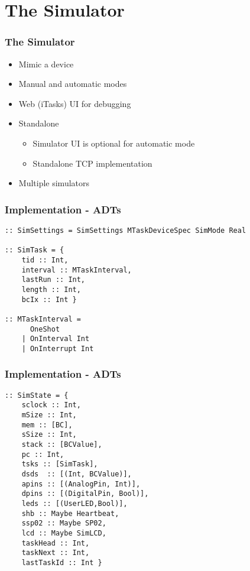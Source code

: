 \documentclass[department=icis, notes={show notes}, slidesperpage=1, official=true,showdate=true,slidenumbers=relative]{beamerruhuisstijl}
\begin{document}
\section{The Simulator}
\begin{frame}[fragile]
  \frametitle{The Simulator}
  \begin{itemize}
      \setlength\itemsep{1em}
      \item Mimic a device
      \item Manual and automatic modes
      \item Web (iTasks) UI for debugging
      \item Standalone
      \begin{itemize}[label=$\diamond$]
          \item Simulator UI is optional for automatic mode
          \item Standalone TCP implementation
      \end{itemize}
      \item Multiple simulators
  \end{itemize}
\end{frame}

\begin{frame}[fragile]
  \frametitle{Implementation - ADTs}
  \begin{lstlisting}
:: SimSettings = SimSettings MTaskDeviceSpec SimMode Real

:: SimTask = {
	tid :: Int,
	interval :: MTaskInterval,
	lastRun :: Int,
	length :: Int,
	bcIx :: Int }
	
:: MTaskInterval = 
      OneShot
    | OnInterval Int
    | OnInterrupt Int 
  \end{lstlisting}
\end{frame}

\begin{frame}[fragile]
  \frametitle{Implementation - ADTs}
  \begin{lstlisting}
:: SimState = { 
	sclock :: Int,
	mSize :: Int, 
	mem :: [BC],
	sSize :: Int,
	stack :: [BCValue],
	pc :: Int,
	tsks :: [SimTask],
	dsds  :: [(Int, BCValue)],
	apins :: [(AnalogPin, Int)], 
	dpins :: [(DigitalPin, Bool)],
	leds :: [(UserLED,Bool)],
	shb :: Maybe Heartbeat,
	ssp02 :: Maybe SP02,
	lcd :: Maybe SimLCD,
	taskHead :: Int,
	taskNext :: Int,
	lastTaskId :: Int }
  \end{lstlisting}
\end{frame}
\end{document}

